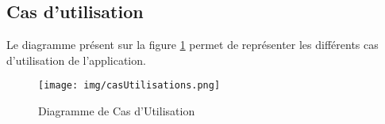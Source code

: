 \subsection{Cas d'utilisation}

Le diagramme présent sur la figure \ref{casUtilisations} permet de représenter les différents cas d'utilisation de l'application.
	
\begin{figure}[!h]
	\begin{center}
	
		\texttt{[image: img/casUtilisations.png]}
	    \caption{Diagramme de Cas d'Utilisation}
	    \label{casUtilisations} 
	
	\end{center}
\end{figure}

\newpage